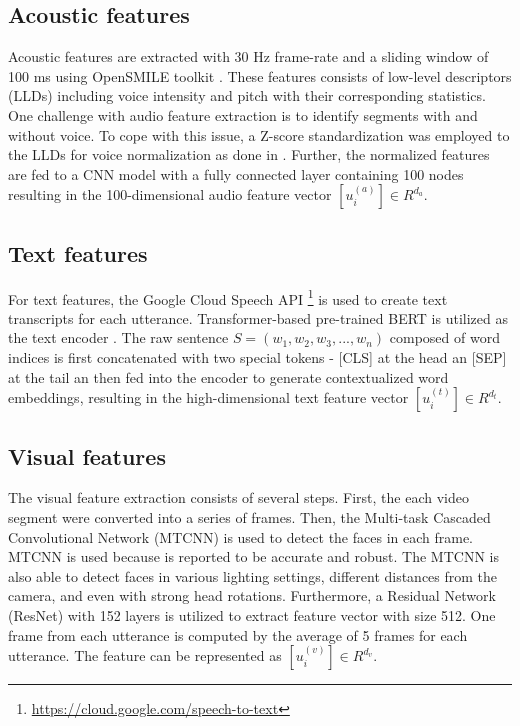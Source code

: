 \subsection{Acoustic features}
Acoustic features are extracted with 30 Hz frame-rate and a sliding window of 100 ms using OpenSMILE toolkit \cite{opensmile}. These features consists of low-level descriptors (LLDs) including voice intensity and pitch with their corresponding statistics. One challenge with audio feature extraction is to identify segments with and without voice. To cope with this issue, a Z-score standardization was employed to the LLDs for voice normalization as done in \cite{z-score-8215597}. Further, the normalized features are fed to a CNN model with a fully connected layer containing 100 nodes resulting in the 100-dimensional audio feature vector $[u_i^{(a)}]\in R^{d_{a}}$. 

\subsection{Text features}
For text features, the Google Cloud Speech API \footnote{\url{https://cloud.google.com/speech-to-text}} is used to create text transcripts for each utterance. Transformer-based pre-trained BERT is utilized as the text encoder \cite{BERT-reimers2019sentence}. The raw sentence $S = (w_{1}, w_{2}, w_{3}, ..., w_{n})$ composed of word indices is first concatenated with two special tokens - [CLS] at the head an [SEP] at the tail an then fed into the encoder to generate contextualized word embeddings,  resulting in the high-dimensional text feature vector $[u_i^{(t)}]\in R^{d_{t}}$. 

\subsection{Visual features}
The visual feature extraction consists of several steps. First, the each video segment were converted into a series of frames. Then, the Multi-task Cascaded Convolutional Network (MTCNN) \cite{MTCNN-9239720} is used to detect the faces in each frame. MTCNN is used because is reported to be accurate and robust. The MTCNN is also able to detect faces in various lighting settings, different distances from the camera, and even with strong head rotations. Furthermore, a Residual Network (ResNet) with 152 layers is utilized to extract feature vector with size 512. One frame from each utterance is computed by the average of 5 frames for each utterance. The feature can be represented as $[u_i^{(v)}]\in R^{d_{v}}$. \\

